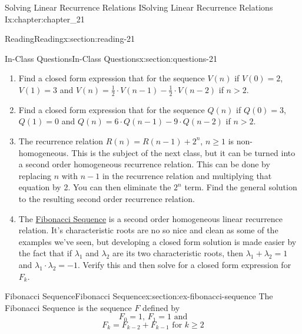 \documentclass[oneside,10pt,]{book}
\numberwithin{equation}{section}
\newcommand{\gt}{>}
\begin{document}
\begin{chapterptx}{Solving Linear Recurrence Relations I}{}{Solving Linear Recurrence Relations I}{}{}{x:chapter:chapter_21}
\begin{sectionptx}{Reading}{}{Reading}{}{}{x:section:reading-21}
\begin{itemize}[label=\textbullet]
\end{itemize}
%
\end{sectionptx}
%
%
\typeout{************************************************}
\typeout{************************************************}
%
\begin{sectionptx}{In-Class Questions}{}{In-Class Questions}{}{}{x:section:questions-21}
%
\begin{enumerate}[label=\arabic*.]
\item{}Find a closed form expression that for the sequence \(V(n)\) if  \(V(0)=2\), \(V(1)= 3\) and \(V(n)= \frac{1}{2}\cdot V(n-1)- \frac{1}{2}\cdot V(n-2)\) if \(n \gt 2\).%
\item{}Find a closed form expression that for the sequence \(Q(n)\) if  \(Q(0)=3\), \(Q(1)= 0\) and \(Q(n)=6\cdot Q(n-1)-9\cdot Q(n-2)\) if \(n \gt 2\).%
\item{}The recurrence relation \(R(n)=R(n-1)+2^n\), \(n \geq 1\) is non-homogeneous.  This is the subject of the next class, but it can be turned into a second order homogeneous recurrence relation.  This can be done by replacing \(n\) with \(n-1\) in the recurrence relation and multiplying that equation by 2.   You can then eliminate the \(2^n\) term. Find the general solution to the resulting second order recurrence relation.%
\item{}The \hyperref[x:section:ex-fibonacci-sequence]{Fibonacci Sequence}  is a second order homogeneous linear recurrence relation. It's characteristic roots are no so nice and clean as some of the examples we've seen, but developing a closed form solution is made easier by the fact that if \(\lambda_1\) and \(\lambda_2\) are its two characteristic roots, then \(\lambda_1 + \lambda_2 = 1\) and \(\lambda_1 \cdot \lambda_2 =-1\).  Verify this and then solve for a closed form expression for \(F_k\).%
\end{enumerate}
%
\end{sectionptx}
%
%
\typeout{************************************************}
\typeout{************************************************}
%
\begin{sectionptx}{Fibonacci Sequence}{}{Fibonacci Sequence}{}{}{x:section:ex-fibonacci-sequence}
%
The Fibonacci Sequence is the sequence \(F\) defined by%
\begin{equation*}
F_0= 1 \textrm{, } F_1= 1\textrm{ and}
\end{equation*}
%
\begin{equation*}
F_k = F_{k-2} + F_{k-1} \textrm{ for }k\geq 2
\end{equation*}
%
\end{sectionptx}
\end{chapterptx}
\end{document}
